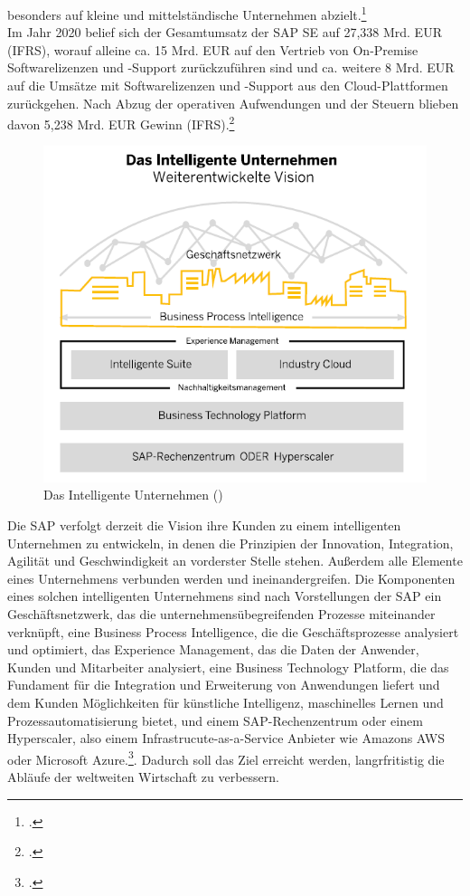 besonders auf kleine und mittelständische Unternehmen abzielt.\footcite[Vgl.][]{sap-historie}\\ Im Jahr 2020 belief sich der Gesamtumsatz der SAP SE auf 27,338 Mrd. EUR (IFRS), worauf alleine ca. 15 Mrd. EUR auf den Vertrieb von \glqq{}On-Premise\grqq{} Softwarelizenzen und -Support zurückzuführen sind und ca. weitere 8 Mrd. EUR auf die Umsätze mit Softwarelizenzen und -Support aus den Cloud-Plattformen zurückgehen. Nach Abzug der operativen Aufwendungen und der Steuern blieben davon 5,238 Mrd. EUR Gewinn (IFRS).\footcite[Vgl.][S. 142]{sap2020-report} 

\begin{figure}[h]
    \centering
    \includegraphics[scale=1]{Bilder/SAPIntelligentesUnternehmen.png}
    \caption[Das Intelligente Unternehmen]{Das Intelligente Unternehmen (\cite[][S. 53]{sap2020-report})}
\end{figure}

Die SAP verfolgt derzeit die Vision ihre Kunden zu einem intelligenten Unternehmen zu entwickeln, in denen die Prinzipien der Innovation, Integration, Agilität und Geschwindigkeit an vorderster Stelle stehen. Außerdem alle Elemente eines Unternehmens verbunden werden und ineinandergreifen. Die Komponenten eines solchen intelligenten Unternehmens sind nach Vorstellungen der SAP ein Geschäftsnetzwerk, das die unternehmensübegreifenden Prozesse miteinander verknüpft, eine Business Process Intelligence, die die Geschäftsprozesse analysiert und optimiert, das Experience Management, das die Daten der Anwender, Kunden und Mitarbeiter analysiert, eine Business Technology Platform, die das Fundament für die Integration und Erweiterung von Anwendungen liefert und dem Kunden Möglichkeiten für künstliche Intelligenz, maschinelles Lernen und Prozessautomatisierung bietet, und einem SAP-Rechenzentrum oder einem Hyperscaler, also einem Infrastrucute-as-a-Service Anbieter wie Amazons AWS oder Microsoft Azure.\footcite[Vgl.][S. 53 f.]{sap2020-report}. Dadurch soll das Ziel erreicht werden, langrfritistig die Abläufe der weltweiten Wirtschaft zu verbessern.


